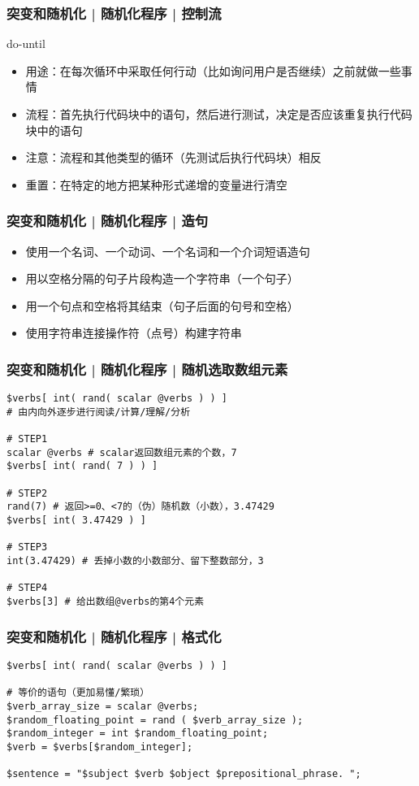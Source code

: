 \begin{frame}
  \frametitle{突变和随机化 | 随机化程序 | \alert{控制流}}
  \begin{block}{do-until}
    \begin{itemize}
      \item 用途：在每次循环中采取任何行动（比如询问用户是否继续）之前就做一些事情
      \item 流程：首先执行代码块中的语句，然后进行测试，决定是否应该重复执行代码块中的语句
      \item 注意：流程和其他类型的循环（先测试后执行代码块）相反
      \item 重置：在特定的地方把某种形式递增的变量进行清空
    \end{itemize}
  \end{block}
\end{frame}

\begin{frame}
  \frametitle{突变和随机化 | 随机化程序 | 造句}
  \begin{itemize}
    \item 使用一个名词、一个动词、一个名词和一个介词短语造句
    \item 用以空格分隔的句子片段构造一个字符串（一个句子）
    \item 用一个句点和空格将其结束（句子后面的句号和空格）
    \item 使用字符串连接操作符（点号）构建字符串
  \end{itemize}
\end{frame}

\begin{frame}[fragile]
  \frametitle{突变和随机化 | 随机化程序 | \alert{随机选取数组元素}}
\begin{lstlisting}[basicstyle=\small\tt]
$verbs[ int( rand( scalar @verbs ) ) ] 
# 由内向外逐步进行阅读/计算/理解/分析

# STEP1
scalar @verbs # scalar返回数组元素的个数，7
$verbs[ int( rand( 7 ) ) ]

# STEP2
rand(7) # 返回>=0、<7的（伪）随机数（小数），3.47429
$verbs[ int( 3.47429 ) ]

# STEP3
int(3.47429) # 丢掉小数的小数部分、留下整数部分，3

# STEP4
$verbs[3] # 给出数组@verbs的第4个元素
\end{lstlisting}
\end{frame}

\begin{frame}[fragile]
  \frametitle{突变和随机化 | 随机化程序 | 格式化}
\begin{lstlisting}
$verbs[ int( rand( scalar @verbs ) ) ] 

# 等价的语句（更加易懂/繁琐）
$verb_array_size = scalar @verbs;
$random_floating_point = rand ( $verb_array_size );
$random_integer = int $random_floating_point;
$verb = $verbs[$random_integer];

$sentence = "$subject $verb $object $prepositional_phrase. ";
\end{lstlisting}
\end{frame}

